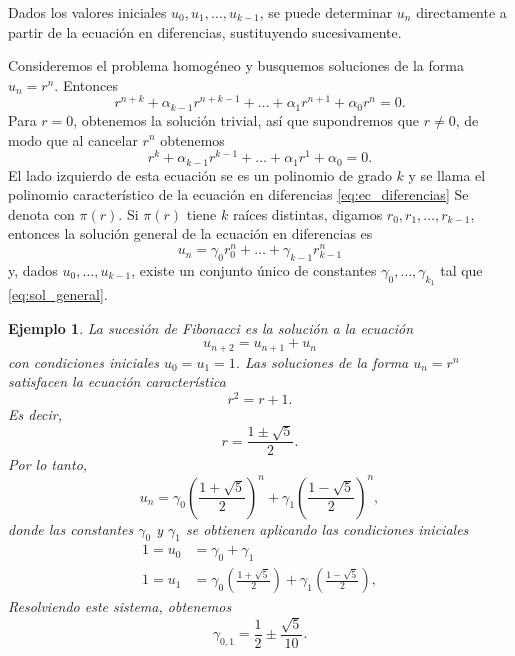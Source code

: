 \documentclass[11pt,letterpaper]{report}
\newtheorem{example}{Ejemplo}
\begin{document}
Dados los valores iniciales $u_0,u_1,\dots,u_{k-1}$, se puede
determinar $u_n$ directamente a partir de la ecuación en diferencias,
sustituyendo sucesivamente.

Consideremos el problema homogéneo y busquemos soluciones de la forma
$u_n=r^{n}$. Entonces
\begin{equation}
  r^{n+k} + \alpha_{k-1}r^{n+k-1}
  + \dots +
  \alpha_1 r^{n+1}+\alpha_0r^n
  =
  0.
\end{equation}
Para $r=0$, obtenemos la solución trivial, así que supondremos que
$r\neq 0$, de modo que al cancelar $r^{n}$ obtenemos
\begin{equation}
  r^{k} + \alpha_{k-1}r^{k-1}
  + \dots +
  \alpha_1 r^{1}+\alpha_0
  =
  0.
\end{equation}
El lado izquierdo de esta ecuación se es un polinomio de grado $k$ y
se llama el polinomio característico de la ecuación en diferencias
\eqref{eq:ec_diferencias} 
Se denota con $\pi(r)$.
Si $\pi(r)$ tiene $k$ raíces distintas, digamos
$r_0,r_1,\dots,r_{k-1}$, entonces la solución general de la ecuación
en diferencias es
\begin{equation}\label{eq:sol_general}
  u_n = \gamma_0r_0^{n} + \dots + \gamma_{k-1}r_{k-1}^{n}
\end{equation}
y, dados $u_0,\dots,u_{k-1}$, existe un conjunto único de constantes
$\gamma_0,\dots,\gamma_{k_1}$ tal que \eqref{eq:sol_general}.

\begin{example}
  La sucesión de Fibonacci es la solución a la ecuación
  \begin{equation}
    u_{n+2} = u_{n+1} + u_n
  \end{equation}
  con condiciones iniciales $u_0=u_1=1$.
  Las soluciones de la forma $u_n=r^n$ satisfacen la ecuación
  característica
  \begin{equation}
    r^2 = r + 1
  .\end{equation}
  Es decir,
  \begin{equation}
    r = \frac{1\pm\sqrt 5}{2}
  .\end{equation}
  Por lo tanto,
  \begin{equation}
    u_n = \gamma_0
    \left( \frac{1+\sqrt 5}{2} \right)^n
    +
    \gamma_1
    \left( \frac{1-\sqrt 5}{2} \right)^n
  ,\end{equation}
  donde las constantes $\gamma_0$ y $\gamma_1$ se obtienen aplicando
  las condiciones iniciales
  \begin{align}
    1 = u_0 &= \gamma_0
    +
    \gamma_1
    \\
    1 = u_1 &= \gamma_0
    \left( \frac{1+\sqrt 5}{2} \right)
    +
    \gamma_1
    \left( \frac{1-\sqrt 5}{2} \right)
  ,\end{align}
  Resolviendo este sistema, obtenemos
  \begin{equation}
    \gamma_{0,1} = \frac{1}{2} \pm \frac{\sqrt 5}{10}
  .\end{equation}
\end{example}
\end{document}
